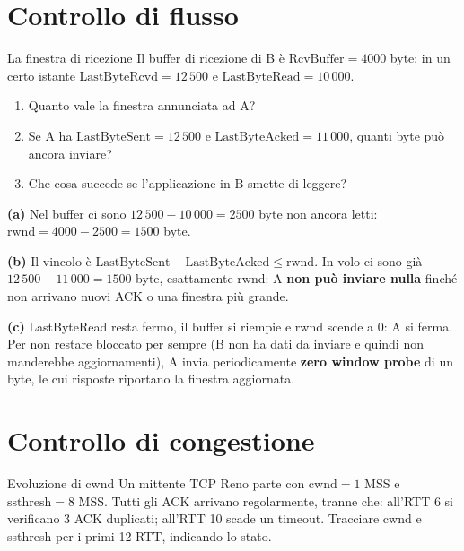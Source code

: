 \section{Controllo di flusso}

\begin{esercizio}{La finestra di ricezione}
Il buffer di ricezione di B è $\text{RcvBuffer} = 4000$ byte; in un certo istante $\text{LastByteRcvd} = 12\,500$ e
$\text{LastByteRead} = 10\,000$.
\begin{enumerate}[label=(\alph*)]
    \item Quanto vale la finestra annunciata ad A?
    \item Se A ha $\text{LastByteSent} = 12\,500$ e $\text{LastByteAcked} = 11\,000$, quanti byte può ancora inviare?
    \item Che cosa succede se l'applicazione in B smette di leggere?
\end{enumerate}
\end{esercizio}

\svolgimento
\textbf{(a)} Nel buffer ci sono $12\,500 - 10\,000 = 2500$ byte non ancora letti:
$\text{rwnd} = 4000 - 2500 = 1500$ byte.

\textbf{(b)} Il vincolo è $\text{LastByteSent} - \text{LastByteAcked} \le \text{rwnd}$. In volo ci sono già
$12\,500 - 11\,000 = 1500$ byte, esattamente rwnd: A \textbf{non può inviare nulla} finché non arrivano nuovi ACK o una
finestra più grande.

\textbf{(c)} LastByteRead resta fermo, il buffer si riempie e rwnd scende a 0: A si ferma. Per non restare bloccato per sempre
(B non ha dati da inviare e quindi non manderebbe aggiornamenti), A invia periodicamente \textbf{zero window probe} di un byte,
le cui risposte riportano la finestra aggiornata.

\section{Controllo di congestione}

\begin{esercizio}{Evoluzione di cwnd}
Un mittente TCP Reno parte con $\text{cwnd} = 1$ MSS e $\text{ssthresh} = 8$ MSS. Tutti gli ACK arrivano regolarmente, tranne
che: all'RTT 6 si verificano 3 ACK duplicati; all'RTT 10 scade un timeout. Tracciare cwnd e ssthresh per i primi 12 RTT, indicando
lo stato.
\end{esercizio}

